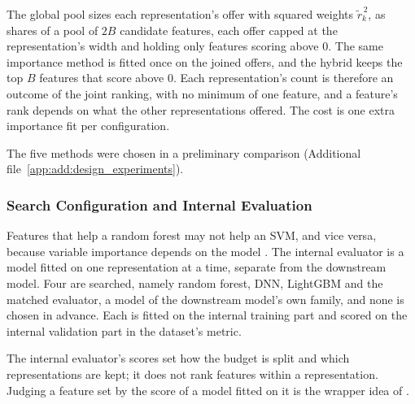 The global pool sizes each representation's offer with squared weights $\tilde r_k^{\,2}$, as shares of a pool of $2B$ candidate features, each offer capped at the representation's width and holding only features scoring above 0. The same importance method is fitted once on the joined offers, and the hybrid keeps the top $B$ features that score above 0. Each representation's count is therefore an outcome of the joint ranking, with no minimum of one feature, and a feature's rank depends on what the other representations offered. The cost is one extra importance fit per configuration.


The five methods were chosen in a preliminary comparison (Additional file~\ref{app:add:design_experiments}).

\subsubsection{Search Configuration and Internal Evaluation}


Features that help a random forest may not help an SVM, and vice versa, because variable importance depends on the model \citep{Dong2020}. The internal evaluator is a model fitted on one representation at a time, separate from the downstream model. Four are searched, namely random forest, DNN, LightGBM and the matched evaluator, a model of the downstream model's own family, and none is chosen in advance. Each is fitted on the internal training part and scored on the internal validation part in the dataset's metric.


The internal evaluator's scores set how the budget is split and which representations are kept; it does not rank features within a representation. Judging a feature set by the score of a model fitted on it is the wrapper idea of \citet{Kohavi1997}.

